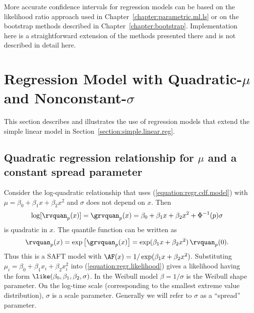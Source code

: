 More accurate confidence intervals for regression models can be based
on the likelihood ratio approach used in
Chapter~\ref{chapter:parametric.ml.ls} or on the bootstrap methods
described in Chapter~\ref{chapter:bootstrap}. Implementation here is a
straightforward extension of the methods presented there and is not 
described in detail here.

\section{Regression Model with Quadratic-$\mu$ and Nonconstant-$\sigma$}
\label{section:quad.regr}
This section describes and illustrates the use of 
regression models that extend the simple linear model in
Section~\ref{section:simple.linear.reg}.

\subsection{Quadratic regression relationship
for $\mu$ and a constant spread parameter}

Consider
the log-quadratic relationship that uses
(\ref{equation:regr.cdf.model}) with $\mu=\beta_{0}+\beta_{1}
x+\beta_{2} x^2$ and $\sigma$ does not depend on $x$. Then
\begin{displaymath}
\log[\rvquan_{p}(x)] =\grvquan_{p}(x)=\beta_{0}+\beta_{1} x + \beta_{2} x^2 + \Phi^{-1}(p)\sigma
\end{displaymath}
is quadratic in $x$. The quantile function can be written as
\begin{displaymath}
\rvquan_{p}(x)=\exp \left [\grvquan_{p}(x) \right ]= \exp(\beta_{1} x+\beta_{2} x^2)
\, \rvquan_{p}(0).
\end{displaymath}
Thus this is a SAFT model with $\AF(x)=1/\exp(\beta_{1}
x+\beta_{2} x^2)$.  Substituting $\mu_{i} = \beta_{0} + \beta_{1}
x_{i} + \beta_{2} x_{i}^{2}$ into (\ref{equation:regr.likelihood})
gives a likelihood having the form $\like(\beta_{0},\beta_{1},
\beta_{2},\sigma)$.  In the Weibull model $\beta=1/\sigma$ is the
Weibull shape parameter. On the log-time scale (corresponding to the
smallest extreme value distribution), $\sigma$ is a scale parameter.
Generally we will refer to $\sigma$ as a ``spread'' parameter.

